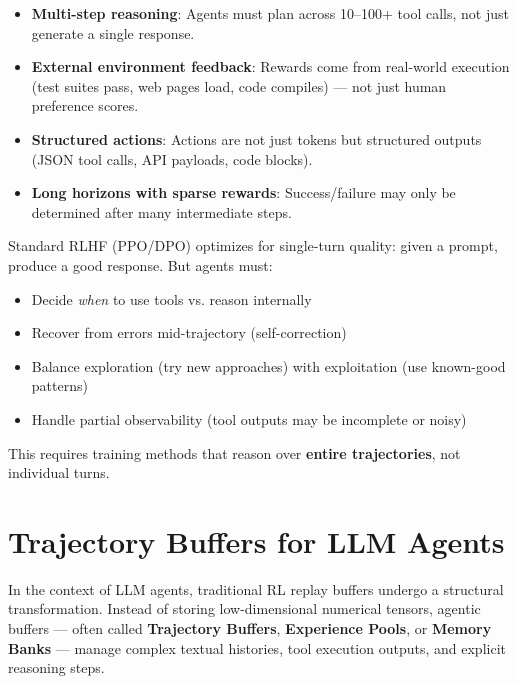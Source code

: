 \begin{itemize}
  \item \textbf{Multi-step reasoning}: Agents must plan across 10--100+ tool calls, not just generate a single response.
  \item \textbf{External environment feedback}: Rewards come from real-world execution (test suites pass, web pages load, code compiles) --- not just human preference scores.
  \item \textbf{Structured actions}: Actions are not just tokens but structured outputs (JSON tool calls, API payloads, code blocks).
  \item \textbf{Long horizons with sparse rewards}: Success/failure may only be determined after many intermediate steps.
\end{itemize}

\begin{intuitionbox}
Standard RLHF (PPO/DPO) optimizes for single-turn quality: given a prompt, produce a good response. But agents must:

\begin{itemize}
  \item Decide \emph{when} to use tools vs. reason internally
  \item Recover from errors mid-trajectory (self-correction)
  \item Balance exploration (try new approaches) with exploitation (use known-good patterns)
  \item Handle partial observability (tool outputs may be incomplete or noisy)
\end{itemize}

This requires training methods that reason over \textbf{entire trajectories}, not individual turns.
\end{intuitionbox}

\section{Trajectory Buffers for LLM Agents}
\label{trajectory-buffers-for-llm-agents}

In the context of LLM agents, traditional RL replay buffers undergo a structural transformation. Instead of storing low-dimensional numerical tensors, agentic buffers --- often called \textbf{Trajectory Buffers}, \textbf{Experience Pools}, or \textbf{Memory Banks} --- manage complex textual histories, tool execution outputs, and explicit reasoning steps.

